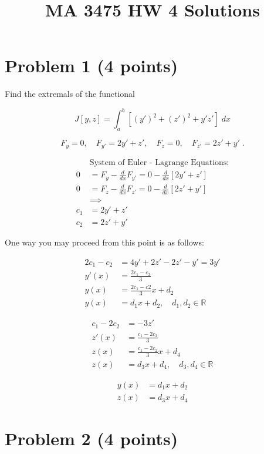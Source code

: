\documentclass[a4paper]{article}
\title{MA 3475 HW 4 Solutions}
\begin{document}
\maketitle


\section*{Problem 1 (4 points)}

Find the extremals of the functional

$$J[y,z] = \int_a^b \left[(y')^2 + (z')^2 + y'z' \right] \; dx $$

$$F_y = 0, \quad F_{y'} = 2y' + z', \quad F_z = 0, \quad F_{z'} = 2z' + y' \;. $$

\begin{align*}
&\text{System of Euler - Lagrange Equations:} \\
0 & = F_y - \frac{d}{dx}F_{y'} = 0 - \frac{d}{dx}[2y' + z'] \\
0 &= F_z - \frac{d}{dx}F_{z'} = 0 - \frac{d}{dx}[2z' + y'] \\
& \implies \\
c_1 &= 2y' + z' \\
c_2 &= 2z' + y'
\end{align*}

One way you may proceed from this point is as follows:

\begin{align*}
2c_1 - c_2 &= 4y' + 2z' - 2z' - y' = 3y' \\
y'(x) &= \frac{2c_1 - c_2}{3} \\
y(x) &= \frac{2c_1 - c2}{3}x + d_2 \\
y(x) &= d_1x + d_2, \quad d_1, d_2 \in \mathbb{R}
\end{align*}

\begin{align*}
c_1 - 2c_2 &= -3z' \\
z'(x) &= \frac{c_1-2c_2}{3} \\
z(x) &= \frac{c_1 - 2c_2}{3}x + d_4 \\
z(x) &= d_3x + d_4, \quad d_3,d_4 \in \mathbb{R}
\end{align*}

\begin{align*}
y(x) &= d_1x +d_2 \\
z(x) &= d_3x + d_4
\end{align*}

\newpage

\section*{Problem 2 (4 points)}
\end{document}
